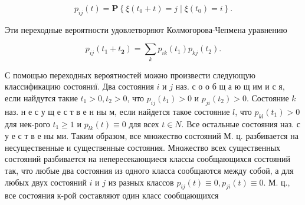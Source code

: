 \documentclass[10pt]{article}
\begin{document}
\[

p_{i j}(t)=\mathbf{P}\left\{\xi\left(t_{0}+t\right)=j \mid \xi\left(t_{0}\right)=i\right\} .

\]



Эти переходные вероятности удовлетворяют Колмогорова-Чепмена уравнению



\[

p_{i j}\left(t_{1}+t_{\mathbf{2}}\right)=\sum_{k} p_{i k}\left(t_{1}\right) p_{k j}\left(t_{2}\right) .

\]



С помощью переходных вероятностей можно произвести следующую классификацию состояниї. Два состояния $i$ и $j$ наз. с о о б щ а ю щ им и с я, если найдутся такие $t_{1}>0, t_{2}>0$, что $p_{i j}\left(t_{1}\right)>0$ и $p_{j i}\left(t_{2}\right)>0$. Состояние $k$ наз. н е с у щ е с т в е н ны м, если найдется такое состояние $l$, что $p_{k l}\left(t_{1}\right)>0$ для нек-рого $t_{1} \geqslant 1$ и $p_{l k}(t) \equiv 0$ для всех $t \in N$. Все остальные состояния наз. с у е с т в е ны ми. Таким образом, все множество состояний М. ц. разбивается на несущественные и существенные состояния. Множество всех существенных состояний разбивается на непересекающиеся классы сообщающихся состояний так, что любые два состояния из одного класса сообщаются между собой, а для любых двух состояний $i$ и $j$ из разных классов $p_{i j}(t) \equiv 0, p_{j i}(t) \equiv 0$. М. ц., все состояния к-рой составляют один класс сообщающихся
\end{document}

